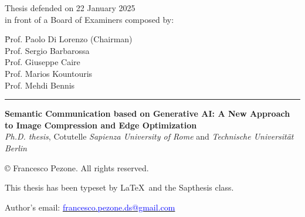 \thispagestyle{empty}

\vspace*{1cm}

\noindent Thesis defended on 22 January 2025 \\
\noindent in front of a Board of Examiners composed by:
\vspace{-0.2cm}
\begin{tabbing}
    \hspace{0.5cm} \= Prof. Paolo Di Lorenzo (Chairman) \\
    \> Prof. Sergio Barbarossa \\
    \> Prof. Giuseppe Caire \\
    \> Prof. Marios Kountouris \\
    \> Prof. Mehdi Bennis \\
\end{tabbing}

\vspace{13cm}

\hrule

\vspace{0.2cm}

\noindent \textbf{Semantic Communication based on Generative AI: A New Approach to Image Compression and Edge Optimization}\\
\noindent \textit{Ph.D. thesis}, Cotutelle \textit{Sapienza University of Rome} and \textit{Technische Universität Berlin}


\vspace{0.5cm}

\noindent \copyright {} Francesco Pezone. All rights reserved.

\vspace{0.5cm}

\noindent This thesis has been typeset by \LaTeX\ and the Sapthesis class.

\vspace{0.5cm}

\noindent Author's email: \href{mailto:francesco.pezone.ds@gmail.com}{\textcolor{blue}{francesco.pezone.ds@gmail.com}}
